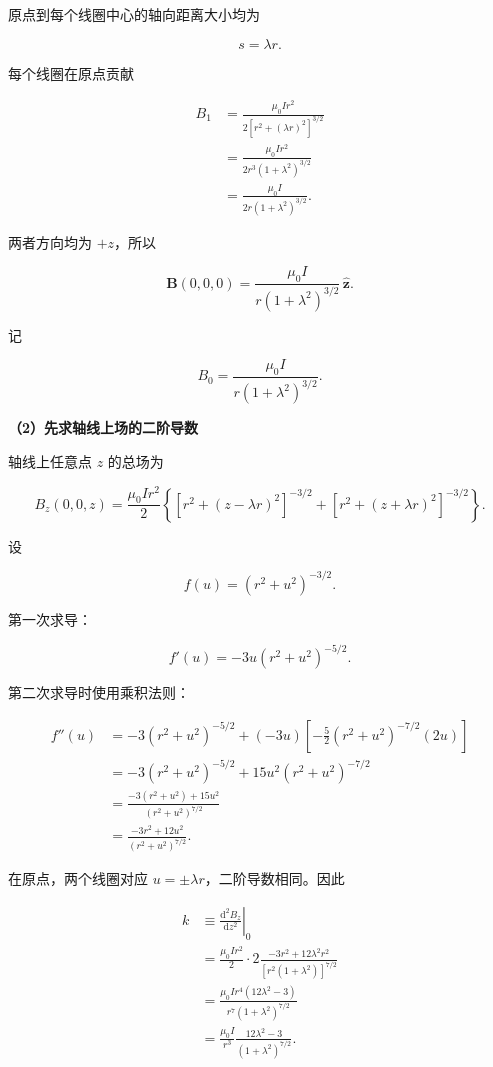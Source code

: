\documentclass[12pt,a4paper,UTF8]{ctexart}
\begin{document}
原点到每个线圈中心的轴向距离大小均为

\[s=\lambda r.\]

每个线圈在原点贡献

\[
\begin{aligned}
B_1
&=\frac{\mu_0Ir^2}
{2[r^2+(\lambda r)^2]^{3/2}}\\
&=\frac{\mu_0Ir^2}
{2r^3(1+\lambda^2)^{3/2}}\\
&=\frac{\mu_0I}{2r(1+\lambda^2)^{3/2}}.
\end{aligned}
\]

两者方向均为 \(+z\)，所以

\[
\boxed{
\bm B(0,0,0)
=\frac{\mu_0I}{r(1+\lambda^2)^{3/2}}\,\hat{\bm z}
}.
\]

记

\[
B_0=\frac{\mu_0I}{r(1+\lambda^2)^{3/2}}.
\]

\textbf{（2）先求轴线上场的二阶导数}

轴线上任意点 \(z\) 的总场为

\[
B_z(0,0,z)=\frac{\mu_0Ir^2}{2}
\left\{
[r^2+(z-\lambda r)^2]^{-3/2}
+[r^2+(z+\lambda r)^2]^{-3/2}
\right\}.
\]

设

\[f(u)=(r^2+u^2)^{-3/2}.\]

第一次求导：

\[
f'(u)=-3u(r^2+u^2)^{-5/2}.
\]

第二次求导时使用乘积法则：

\[
\begin{aligned}
f''(u)
&=-3(r^2+u^2)^{-5/2}
+(-3u)\left[-\frac52(r^2+u^2)^{-7/2}(2u)\right]\\
&=-3(r^2+u^2)^{-5/2}
+15u^2(r^2+u^2)^{-7/2}\\
&=\frac{-3(r^2+u^2)+15u^2}{(r^2+u^2)^{7/2}}\\
&=\frac{-3r^2+12u^2}{(r^2+u^2)^{7/2}}.
\end{aligned}
\]

在原点，两个线圈对应 \(u=\pm\lambda r\)，二阶导数相同。因此

\[
\begin{aligned}
k
&\equiv\left.\frac{\mathrm{d}^2B_z}{\mathrm{d}z^2}\right|_0\\
&=\frac{\mu_0Ir^2}{2}\cdot2
\frac{-3r^2+12\lambda^2r^2}
{[r^2(1+\lambda^2)]^{7/2}}\\
&=\frac{\mu_0Ir^4(12\lambda^2-3)}
{r^7(1+\lambda^2)^{7/2}}\\
&=\boxed{
\frac{\mu_0I}{r^3}
\frac{12\lambda^2-3}{(1+\lambda^2)^{7/2}}
}.
\end{aligned}
\]
\end{document}

